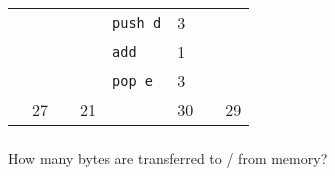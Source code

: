 \documentclass{article}
\begin{document}
\begin{tabular}{l|ll|ll|ll|l|}
\multicolumn{1}{|l|}{} & & \multicolumn{1}{|l|}{} & & \multicolumn{1}{|l|}{\texttt{push d}} & 3 & \multicolumn{1}{|l|}{} & \\ 
\multicolumn{1}{|l|}{} & & \multicolumn{1}{|l|}{} & & \multicolumn{1}{|l|}{\texttt{add}} & 1 & \multicolumn{1}{|l|}{} &\\
\multicolumn{1}{|l|}{} & & \multicolumn{1}{|l|}{} & & \multicolumn{1}{|l|}{\texttt{pop e}} & 3 & \multicolumn{1}{|l|}{} &\\
\hline
 & \multicolumn{1}{|l|}{27} & & \multicolumn{1}{|l|}{21} & & \multicolumn{1}{|l|}{30} & & \multicolumn{1}{|l|}{29} \\
 \cline{2-2}\cline{4-4}\cline{6-6}\cline{8-8}
\end{tabular}
\subsubsection{} 
How many bytes are transferred to / from memory? \\
\end{document}
